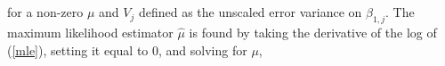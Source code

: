 for a non-zero $\mu$ and $V_j$ defined as the unscaled error variance on $\hat{\beta_{1,j}}$. The maximum likelihood estimator $\hat{\mu}$ is found by taking the derivative of the log of (\ref{mle}), setting it equal to 0, and solving for $\mu$,